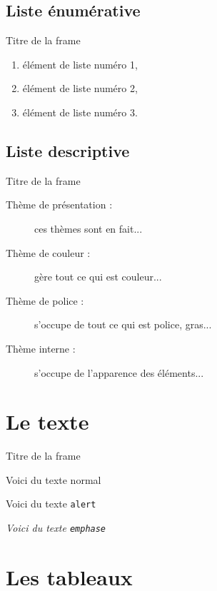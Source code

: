\documentclass{bredelebeamer}
\begin{document}
    \subsection{Liste énumérative}
    \begin{frame}{Titre de la frame}
        \begin{enumerate}
            \item élément de liste numéro 1,
            \item élément de liste numéro 2,
            \item élément de liste numéro 3.
        \end{enumerate}
    \end{frame}


    \subsection{Liste descriptive}
    \begin{frame}{Titre de la frame}
        \begin{description}
            \item [Thème de présentation : ] ces thèmes sont en fait...
            \item [Thème de couleur : ] gère tout ce qui est couleur...
            \item [Thème de police : ] s'occupe de tout ce qui est police, gras...
            \item [Thème interne : ] s'occupe de l'apparence des éléments...
        \end{description}
    \end{frame}



    \section{Le texte}

    \begin{frame}{Titre de la frame}

        Voici du texte normal

        \alert{Voici du texte \texttt{alert}}


        \emph{Voici du texte \texttt{emphase}}

    \end{frame}


    \section{Les tableaux}
\end{document}
